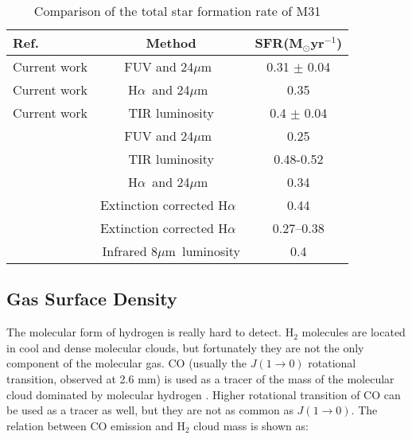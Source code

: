 \documentclass[useAMS,usenatbib]{mn2e}
\newcommand \halpha    {H$\alpha $\ }
\newcommand \um    {$\mu$m\ }
\begin{document}
\begin{table*}
\begin{minipage}{100mm}
\caption{Comparison of the total star formation rate of M31}
\label{table:sfr}
\begin{tabular}{@{}lcc}
\hline\hline
Ref.&Method&SFR(M$_{\odot}$yr$^{-1}$) \\
\hline
Current work&FUV and 24\um&0.31 $\pm$ 0.04\\
Current work&\halpha and 24\um&0.35 \\
Current work&TIR luminosity&0.4 $\pm$ 0.04\\
\cite{Ford13}&FUV and 24\um&0.25\\
\cite{Ford13}&TIR luminosity&0.48-0.52\\
\cite{Azimlu11}& \halpha and 24\um&0.34\\
\cite{Azimlu11}&Extinction corrected \halpha&0.44\\
\cite{Tabatabaei10}&Extinction corrected \halpha&0.27--0.38\\
\cite{Barmby06}&Infrared 8\um luminosity& 0.4\\
\hline
\end{tabular}
\end{minipage}
\end{table*}


\subsection{Gas Surface Density}
\label{sec:ISM}

 The molecular form of hydrogen is really hard to detect. H$_2$ molecules are located in cool and dense molecular clouds, but fortunately they are not the only component of the molecular gas. CO (usually the $J(1\rightarrow 0)$ rotational transition, observed at 2.6 mm) is used as a tracer of the mass of the molecular cloud dominated by molecular hydrogen \citep[see, for example,][] {Sanders84}. Higher rotational transition of CO can be used as a tracer as well, but they are not as common as $J(1\rightarrow 0)$. The relation between CO emission and H$_2$ cloud mass is shown as:
\end{document}

